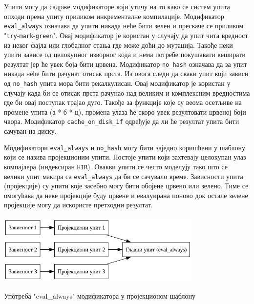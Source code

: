 Упити могу да садрже модификаторе који утичу на то како се систем упита опходи према упиту приликом инкременталне компилације.
Модификатор \verb|eval_always| означава да упити никада неће бити зелен и прескаче се приликом "\verb|try|-\verb|mark|-\verb|green|".
Овај модификатор је користан у случају да упит чита вредност из неког фајла или глобалног стања где може доћи до мутација. Такође неки 
упити зависе од целокупног изворног кода и нема потребе покушавати кеширати резултат јер ће увек боја бити црвена. Модификатор 
\verb|no_hash| означава да за упит никада неће бити рачунат отисак прста. Из овога следи да сваки упит који зависи од \verb|no_hash|
упита мора бити рекалкулисан. Овај модификатор је користан у случају када би се отисак прста рачунао над великим и комплексним 
вредностима где би овај поступак трајао дуго. Такође за функције које су веома осетљиве на промене упита (а * б * ц), промена 
улаза ће скоро увек резултовати црвеној боји чвора. Модификатор \verb|cache_on_disk_if| одређује да ли ће резултат упита бити 
сачуван на диску. 

Модификатори \verb|eval_always| и \verb|no_hash| могу бити заједно коришћени у шаблону који се назива пројекционим упити. Постоје упити који захтевају 
целокупан улаз компајлера (индексиран \verb|HIR|). Овакви упити се често моделују тако што се велики упит макира са \verb|eval_always|
да би се сачувало време. Зависности упита (пројекције) су упити које засебно могу бити обојене црвено или зелено. Тиме се омогућава 
да неке пројекције буду црвене и евалуирана поново док остале зелене пројекције могу да искористе претходни резултат.

\begin{listing}[H]
\begin{center}
\includegraphics[width=4in, height=1.4in]{assets/images/projection_query.png}
\end{center}
\caption{Употреба "eval\_always" модификатора у пројекционом шаблону}
\label{lst:projection_query}
\end{listing}